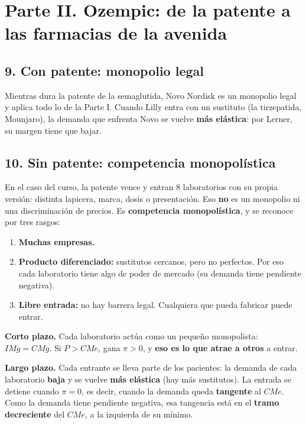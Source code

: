 \documentclass[11pt]{article}
\begin{document}
\section*{Parte II. Ozempic: de la patente a las farmacias de la avenida}

\subsection*{9. Con patente: monopolio legal}

Mientras dura la patente de la semaglutida, Novo Nordisk es un monopolio legal y aplica todo lo de la Parte I. Cuando Lilly entra con un sustituto (la tirzepatida, Mounjaro), la demanda que enfrenta Novo se vuelve \textbf{más elástica}: por Lerner, su margen tiene que bajar.

\subsection*{10. Sin patente: competencia monopolística}

En el caso del curso, la patente vence y entran 8 laboratorios con su propia versión: distinta lapicera, marca, dosis o presentación. Eso \textbf{no} es un monopolio ni una discriminación de precios. Es \textbf{competencia monopolística}, y se reconoce por tres rasgos:
\begin{enumerate}[leftmargin=*,itemsep=2pt]
\item \textbf{Muchas empresas.}
\item \textbf{Producto diferenciado:} sustitutos cercanos, pero no perfectos. Por eso cada laboratorio tiene algo de poder de mercado (su demanda tiene pendiente negativa).
\item \textbf{Libre entrada:} no hay barrera legal. Cualquiera que pueda fabricar puede entrar.
\end{enumerate}

\textbf{Corto plazo.} Cada laboratorio actúa como un pequeño monopolista: $IMg = CMg$. Si $P > CMe$, gana $\pi > 0$, y \textbf{eso es lo que atrae a otros} a entrar.

\textbf{Largo plazo.} Cada entrante se lleva parte de los pacientes: la demanda de cada laboratorio \textbf{baja} y se vuelve \textbf{más elástica} (hay más sustitutos). La entrada se detiene cuando $\pi = 0$, es decir, cuando la demanda queda \textbf{tangente} al $CMe$. Como la demanda tiene pendiente negativa, esa tangencia está en el \textbf{tramo decreciente} del $CMe$, a la izquierda de su mínimo.
\end{document}
